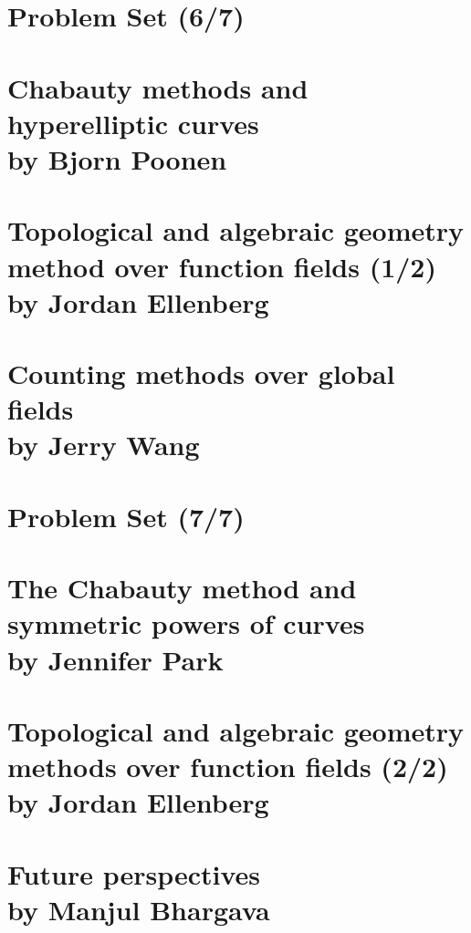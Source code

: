 \documentclass[12pt,amsfont]{amsart}
\begin{document}
\newpage
\renewcommand{\thesubsection}{\arabic{section}.\arabic{subsection}}
\section{Problem Set (6/7)}\label{33}

\newpage
\renewcommand{\thesubsection}{\arabic{section}.\arabic{subsection}}
\section{Chabauty methods and hyperelliptic curves\\ by  Bjorn Poonen}\label{34}

\newpage
\renewcommand{\thesubsection}{\arabic{section}.\arabic{subsection}}
\section{Topological and algebraic geometry method over function fields (1/2) \\ by Jordan Ellenberg}\label{35}

\newpage
\section{Counting methods over global fields\\ by Jerry Wang}\label{36}

\begingroup
\renewcommand{\addcontentsline}[3]{}%
\endgroup


\newpage
\renewcommand{\thesubsection}{\arabic{section}.\arabic{subsection}}
\section{Problem Set (7/7)
}\label{37}


\newpage
\renewcommand{\thesubsection}{\arabic{section}.\arabic{subsection}}
\section{The Chabauty method and symmetric powers of curves
\\ by Jennifer Park}\label{38}

\newpage
\renewcommand{\thesubsection}{\arabic{section}.\arabic{subsection}}
\section{Topological and algebraic geometry methods over function fields (2/2)\\ by Jordan Ellenberg}\label{39}

\newpage
\renewcommand{\thesubsection}{\arabic{section}.\arabic{subsection}}
\section{Future perspectives\\ by  Manjul Bhargava}\label{40}
\end{document}
